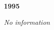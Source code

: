 \begin{center}
  \Huge
  \textbf{1995}
\end{center}

\begin{center}
  \textit{No information}
\end{center}

\vspace{50mm}

\pagebreak

